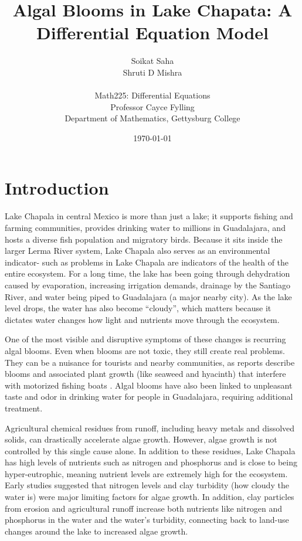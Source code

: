 \documentclass[11pt]{article}
\title{Algal Blooms in Lake Chapata: A Differential Equation Model}
\author{Soikat Saha\\Shruti D Mishra \\ \\
\small Math225: Differential Equations \\
\small Professor Cayce Fylling \\
\small Department of Mathematics, Gettysburg College}
\date{\today}
\begin{document}
\maketitle %

\newpage

\tableofcontents %

\newpage

\section{Introduction}

Lake Chapala in central Mexico is more than just a lake; it supports fishing and farming communities, provides drinking water to millions in Guadalajara, and hosts a diverse fish population and migratory birds. Because it sits inside the larger Lerma River system, Lake Chapala also serves as an environmental indicator- such as problems in Lake Chapala are indicators of the health of the entire ecosystem. For a long time, the lake has been going through dehydration caused by evaporation, increasing irrigation demands, drainage by the Santiago River, and water being piped to Guadalajara (a major nearby city). As the lake level drops, the water has also become ``cloudy'', which matters because it dictates water changes how light and nutrients move through the ecosystem. 

One of the most visible and disruptive symptoms of these changes is recurring algal blooms. Even when blooms are not toxic, they still create real problems. They can be a nuisance for tourists and nearby communities, as reports describe blooms and associated plant growth (like seaweed and hyacinth) that interfere with motorized fishing boats \cite{harwood-algae}. Algal blooms have also been linked to unpleasant taste and odor in drinking water for people in Guadalajara, requiring additional treatment.

Agricultural chemical residues from runoff, including heavy metals and dissolved solids, can drastically accelerate algae growth. However, algae growth is not controlled by this single cause alone. In addition to these residues, Lake Chapala has high levels of nutrients such as nitrogen and phosphorus and is close to being hyper-eutrophic, meaning nutrient levels are extremely high for the ecosystem. Early studies suggested that nitrogen levels and clay turbidity (how cloudy the water is) were major limiting factors for algae growth. In addition, clay particles from erosion and agricultural runoff increase both nutrients like nitrogen and phosphorus in the water and the water’s turbidity, connecting back to land-use changes around the lake to increased algae growth.
\end{document}
